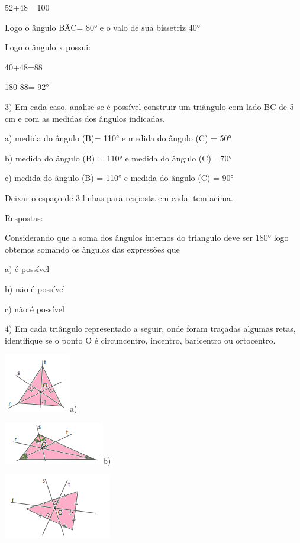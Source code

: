 52+48 =100

Logo o ângulo BÂC= 80° e o valo de sua bissetriz 40°

Logo o ângulo x possui:

40+48=88

180-88= 92°

3) Em cada caso, analise se é possível construir um triângulo com lado
BC de 5 cm e com as medidas dos ângulos indicadas.

a) medida do ângulo (B)= 110° e medida do ângulo (C) = 50°

b) medida do ângulo (B) = 110° e medida do ângulo (C)= 70°

c) medida do ângulo (B) = 110° e medida do ângulo (C) = 90°

Deixar o espaço de 3 linhas para resposta em cada item acima.

Respostas:

Considerando que a soma dos ângulos internos do triangulo deve ser 180°
logo obtemos somando os ângulos das expressões que

a) é possível

b) não é possível

c) não é possível

4) Em cada triângulo representado a seguir, onde foram traçadas algumas
retas, identifique se o ponto O é circuncentro, incentro, baricentro ou
ortocentro.

\includegraphics[width=1.14583in,height=1.01042in]{./imgSAEB_8_MAT/media/image15.png}a)

\includegraphics[width=1.72917in,height=0.71875in]{./imgSAEB_8_MAT/media/image16.png}b)

\includegraphics[width=1.84375in,height=1.125in]{./imgSAEB_8_MAT/media/image17.png}


